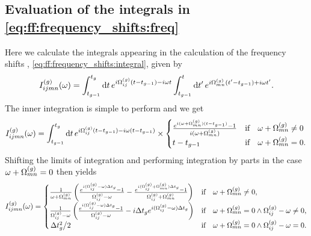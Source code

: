 \subsection{Evaluation of the integrals in \cref{eq:ff:frequency_shifts:freq}}\label{subsec:app:ff:derivations:frequency_shifts:integral}
Here we calculate the integrals appearing in the calculation of the frequency shifts \freqshifts, \cref{eq:ff:frequency_shifts:integral}, given by
\begin{equation}
    I_{ijmn}^{(g)}(\omega) = \int_{t_{g-1}}^{t_g}\dd{t}e^{i\Omega_{ij}^{(g)}(t - t_{g-1}) - i\omega t}
                              \int_{t_{g-1}}^{t}\dd{t'}e^{i\Omega_{mn}^{(g)}(t' - t_{g-1}) + i\omega t'}.
\end{equation}
The inner integration is simple to perform and we get
\begin{equation}
    I_{ijmn}\gth{g}(\omega) = \int_{t_{g-1}}^{t_g}\dd{t}\e^{\i\Omega_{ij}\gth{g}(t - t_{g-1}) - \i\omega(t - t_{g-1})}\times
    \begin{cases}
        \frac{\e^{\i(\omega + \Omega_{mn}\gth{g})(t - t_{g-1})} - 1}{\i(\omega + \Omega_{mn}\gth{g})}   &\qif* \omega + \Omega_{mn}\gth{g}\neq 0 \\
        t - t_{g-1}                                                                                     &\qif* \omega + \Omega_{mn}\gth{g} = 0.
    \end{cases}
\end{equation}
Shifting the limits of integration and performing integration by parts in the case $\omega + \Omega_{mn}^{(g)} = 0$ then yields
\begin{equation}
    I_{ijmn}\gth{g}(\omega) = \begin{cases}
        \frac{1}{\omega + \Omega_{mn}\gth{g}}\left(
            \frac{\e^{\i(\Omega_{ij}\gth{g} - \omega)\Delta t_g} - 1}{\Omega_{ij}\gth{g} - \omega} -
            \frac{\e^{\i(\Omega_{ij}\gth{g} + \Omega_{mn}\gth{g})\Delta t_g} - 1}{\Omega_{ij}\gth{g} + \Omega_{mn}\gth{g}}
        \right) &\qif* \omega + \Omega_{mn}\gth{g}\neq 0, \\
        \frac{1}{\Omega_{ij}\gth{g} - \omega}\left(
            \frac{\e^{\i(\Omega_{ij}\gth{g} - \omega)\Delta t_g} - 1}{\Omega_{ij}\gth{g} - \omega} -
            \i\Delta t_g\e^{\i(\Omega_{ij}\gth{g} - \omega)\Delta t_g}
        \right) &\qif* \omega + \Omega_{mn}\gth{g} = 0 \wedge \Omega_{ij}\gth{g} - \omega\neq 0, \\
        \flatfrac{\Delta t_g^2}{2} &\qif* \omega + \Omega_{mn}\gth{g} = 0 \wedge \Omega_{ij}\gth{g} - \omega = 0.
    \end{cases}
\end{equation}

